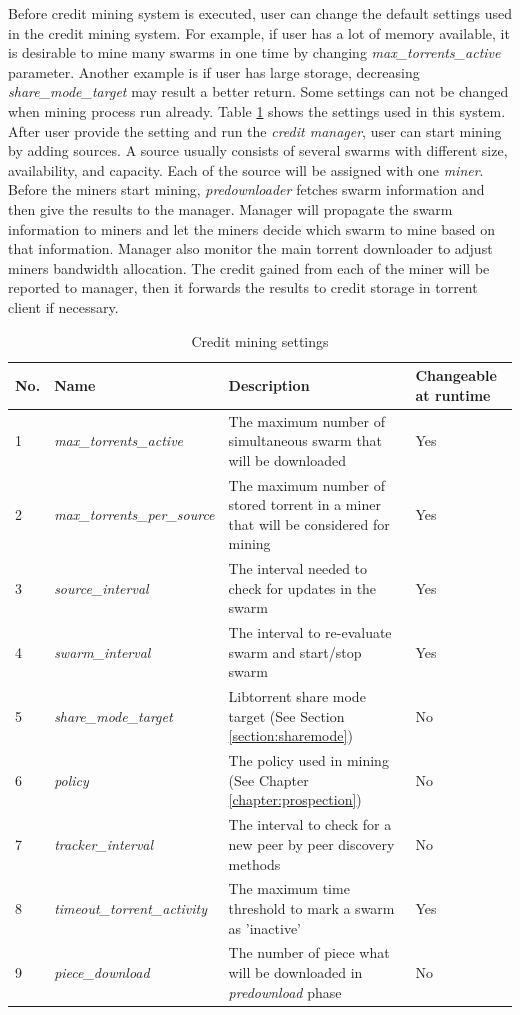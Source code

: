 Before credit mining system is executed, user can change the default settings used in the credit mining system. For example, if user has a lot of memory available, it is desirable to mine many swarms in one time by changing \textit{max\_torrents\_active} parameter. Another example is if user has large storage, decreasing \textit{share\_mode\_target} may result a better return. Some settings can not be changed when mining process run already. Table \ref{tbl:cmsettings} shows the settings used in this system. After user provide the setting and run the \textit{credit manager}, user can start mining by adding sources. A source usually consists of several swarms with different size, availability, and capacity. Each of the source will be assigned with one \textit{miner}. Before the miners start mining, \textit{predownloader} fetches swarm information and then give the results to the manager. Manager will propagate the swarm information to miners and let the miners decide which swarm to mine based on that information. Manager also monitor the main torrent downloader to adjust miners bandwidth allocation. The credit gained from each of the miner will be reported to manager, then it forwards the results to credit storage in torrent client if necessary.

\begin{table}[h]
	\centering
	\caption{Credit mining settings}
	\label{tbl:cmsettings}
	\begin{adjustwidth}{-1.5cm}{}
	\begin{tabular}{|p{1cm}|p{4cm}|p{7cm}|p{2cm}|}
		\hline
		\rowcolor[HTML]{EFEFEF} 
		No. & Name & Description & Changeable at runtime \\ \hline
	1 & \textit{max\_torrents\_active} & The maximum number of simultaneous swarm that will be downloaded & Yes \\ \hline
	2 & \textit{max\_torrents\_per\_source} & The maximum number of stored torrent in a miner that will be considered for mining & Yes \\ \hline
	3 & \textit{source\_interval} & The interval needed to check for updates in the swarm & Yes \\ \hline
	4 & \textit{swarm\_interval} & The interval to re-evaluate swarm and start/stop swarm & Yes \\ \hline
	5 & \textit{share\_mode\_target} & Libtorrent share mode target (See Section \ref{section:sharemode}) & No \\ \hline
	6 & \textit{policy} & The policy used in mining (See Chapter \ref{chapter:prospection}) & No \\ \hline
	7 & \textit{tracker\_interval} & The interval to check for a new peer by peer discovery methods & No \\ \hline
	8 & \textit{timeout\_torrent\_activity} & The maximum time threshold to mark a swarm as 'inactive' & Yes \\ \hline
	9 & \textit{piece\_download} & The number of piece what will be downloaded in \textit{predownload} phase & No \\ \hline
	\end{tabular}
	\end{adjustwidth}
\end{table}



